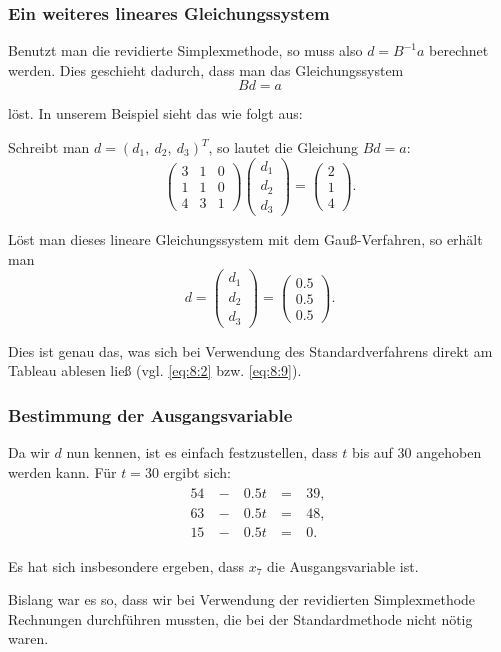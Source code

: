 \documentclass[smaller]{beamer}
\begin{document}
\begin{frame}
 \frametitle{Ein weiteres lineares Gleichungssystem}
 Benutzt man die \alert{revidierte Simplexmethode}, so muss also $d = B^{-1}a$ berechnet werden. Dies geschieht dadurch, dass man das Gleichungssystem
\[
Bd=a
\]

löst. In unserem Beispiel sieht das wie folgt aus: \\ \vspace*{0.2cm}

Schreibt man $d = {(d_1,\ d_2,\ d_3)}^T$, so lautet die Gleichung $Bd=a$:
\[
\begin{pmatrix} 3 & 1 & 0 \\ 1 & 1 & 0 \\ 4 & 3 & 1 \end{pmatrix} \begin{pmatrix} d_1 \\ d_2 \\ d_3 \end{pmatrix} = \begin{pmatrix} 2 \\ 1 \\ 4 \end{pmatrix}.
\]

Löst man dieses lineare Gleichungssystem mit dem Gauß-Verfahren, so erhält man
\[
d = \begin{pmatrix} d_1 \\ d_2 \\ d_3 \end{pmatrix} = \begin{pmatrix} 0.5 \\ 0.5 \\ 0.5 \end{pmatrix}.
\]

Dies ist genau das, was sich bei Verwendung des Standardverfahrens direkt am Tableau ablesen ließ (vgl. \eqref{eq:8:2} bzw. \eqref{eq:8:9}).
\end{frame}

\begin{frame}
 \frametitle{Bestimmung der Ausgangsvariable}
Da wir $d$ nun kennen, ist es einfach festzustellen, dass $t$ bis auf 30 angehoben werden kann. Für $t=30$ ergibt sich:
\begin{align*}
\begin{alignedat}{3}
54 &\ - &\ 0.5t &\ = &\ 39,\ \\
63 &\ - &\ 0.5t &\ = &\ 48,\ \\
15 &\ - &\ 0.5t &\ = &\  0.\  
\end{alignedat}
\end{align*}

Es hat sich insbesondere ergeben, dass $x_7$ die Ausgangsvariable ist. \\ \vspace*{0.2cm}

\alert{Bislang war es so, dass wir bei Verwendung der revidierten Simplexmethode Rechnungen durchführen mussten, die bei der Standardmethode nicht nötig waren}. 
\end{frame}
\end{document}
